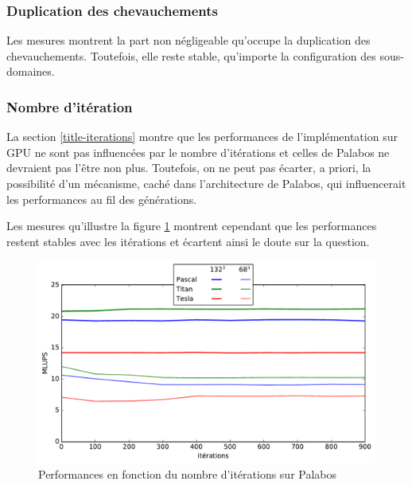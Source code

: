 \subsubsection{Duplication des chevauchements}
Les mesures montrent la part non négligeable qu'occupe la duplication des chevauchements. Toutefois, elle reste stable, qu'importe la configuration des sous-domaines.

\subsubsection{Nombre d'itération}\label{title-iterations_palabos}
La section \ref{title-iterations} montre que les performances de l'implémentation sur \acs{GPU} ne sont pas influencées par le nombre d'itérations et celles de Palabos ne devraient pas l'être non plus. Toutefois, on ne peut pas écarter, a priori, la possibilité d'un mécanisme, caché dans l'architecture de Palabos, qui influencerait les performances au fil des générations.

Les mesures qu'illustre la figure \ref{fig:lups_by_iter_palabos} montrent cependant que les performances restent stables avec les itérations et écartent ainsi le doute sur la question.

\begin{figure}[H]
	\centering
	\includegraphics[fbox, scale=0.61]{images/perfs/cavity_benchmark/lups_by_iter.pdf}
	\caption{Performances en fonction du nombre d'itérations sur Palabos}
	\label{fig:lups_by_iter_palabos}
\end{figure}


